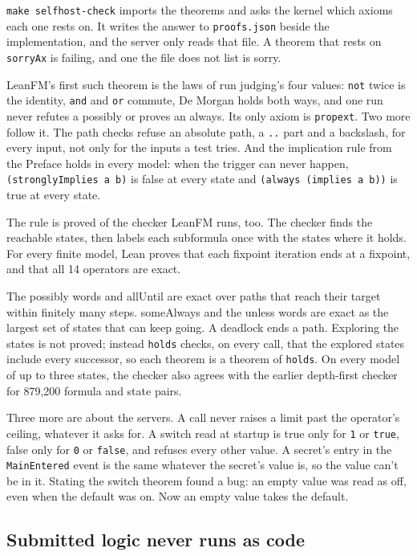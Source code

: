 \texttt{make selfhost-check} imports the theorems and asks the kernel which axioms each one rests
on. It writes the answer to \texttt{proofs.json} beside the implementation, and the server only
reads that file. A theorem that rests on \texttt{sorryAx} is failing, and one the file does not
list is sorry.

LeanFM's first such theorem is the laws of run judging's four values: \texttt{not}
twice is the identity, \texttt{and} and \texttt{or} commute, De Morgan holds both ways, and one run
never refutes a \textsf{possibly} or proves an \textsf{always}. Its only axiom is \texttt{propext}.
Two more follow it. The path checks refuse an absolute path, a \texttt{..} part and a backslash,
for every input, not only for the inputs a test tries. And the implication rule from the Preface
holds in every model: when the trigger can never happen, \texttt{(stronglyImplies a b)} is false at
every state and \texttt{(always (implies a b))} is true at every state.

The rule is proved of the checker LeanFM runs, too. The checker finds the reachable states, then
labels each subformula once with the states where it holds. For every finite model, Lean proves that
each fixpoint iteration ends at a fixpoint, and that all 14 operators are exact.

The \textsf{possibly} words and \textsf{allUntil} are exact over paths that reach their target within
finitely many steps. \textsf{someAlways} and the \textsf{unless} words are exact as the largest set of
states that can keep going. A deadlock ends a path. Exploring the states is not proved; instead \texttt{holds} checks, on
every call, that the explored states include every successor, so each theorem is a theorem of
\texttt{holds}. On every model of up to three states, the checker also agrees with the earlier depth-first
checker for 879,200 formula and state pairs.

Three more are about the servers. A call never raises a limit past the operator's ceiling,
whatever it asks for. A switch read at startup is true only for \texttt{1} or \texttt{true},
false only for \texttt{0} or \texttt{false}, and refuses every other value. A secret's entry in the
\texttt{MainEntered} event is the same whatever the secret's value is, so the value can't be in it.
Stating the switch theorem found a bug: an empty value was read as off, even when the default was
on. Now an empty value takes the default.

\subsection{Submitted logic never runs as code}

